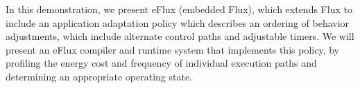 \documentclass[letterpaper,times,twocolumn,10pt]{article}
\begin{document}
{In this demonstration, we present eFlux (embedded Flux), which extends
Flux to include an application adaptation policy which describes an
ordering of behavior adjustments, which include alternate control
paths and adjustable timers.  We will present an eFlux compiler and
runtime system that implements this policy, by profiling the energy
cost and frequency of individual execution paths and determining an
appropriate operating state.  




}
\end{document}
